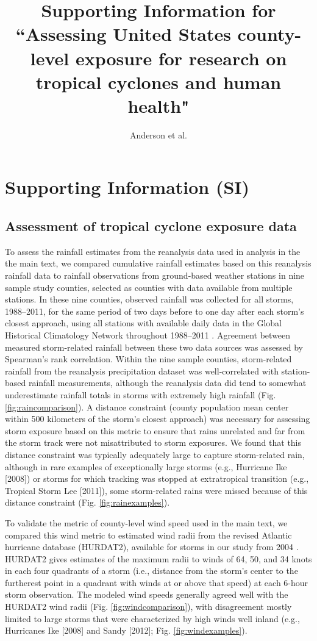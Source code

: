 \documentclass[fleqn,10pt,lineno]{olplainarticle}
\title{Supporting Information for ``Assessing United States county-level exposure for research on tropical cyclones and human health"}
\author{Anderson et al.}
\begin{document}
\flushbottom 
\maketitle 
\thispagestyle{empty}

\section*{Supporting Information (SI)}

\subsection*{Assessment of tropical cyclone exposure data}

To assess the rainfall estimates from the reanalysis data used in analysis in the the main text, we compared cumulative rainfall estimates based on this reanalysis rainfall data to rainfall observations from ground-based weather stations in nine sample study counties, selected as counties with data available from multiple stations. In these nine counties, observed rainfall was collected for all storms, 1988--2011, for the same period of two days before to one day after each storm's closest approach, using all stations with available daily data in the Global Historical Climatology Network throughout 1988--2011 \cite{menne2012overview, rnoaa, countyweather}. Agreement between measured storm-related rainfall between these two data sources was assessed by Spearman's rank correlation. Within the nine sample counties, storm-related rainfall from the reanalysis precipitation dataset was well-correlated with station-based rainfall measurements, although the reanalysis data did tend to somewhat underestimate rainfall totals in storms with extremely high rainfall (Fig. \ref{fig:raincomparison}). A distance constraint (county population mean center within 500 kilometers of the storm's closest approach) was necessary for assessing storm exposure based on this metric to ensure that rains unrelated and far from the storm track were not misattributed to storm exposures. We found that this distance constraint was typically adequately large to capture storm-related rain, although in rare examples of exceptionally large storms (e.g., Hurricane Ike [2008]) or storms for which tracking was stopped at extratropical transition (e.g., Tropical Storm Lee [2011]), some storm-related rains were missed because of this distance constraint (Fig. \ref{fig:rainexamples}).

To validate the metric of county-level wind speed used in the main text, we compared this wind metric to estimated wind radii from the revised Atlantic hurricane database (HURDAT2), available for storms in our study from 2004 \cite{landsea2013}. HURDAT2 gives estimates of the maximum radii to winds of 64, 50, and 34 knots in each four quadrants of a storm (i.e., distance from the storm's center to the furtherest point in a quadrant with winds at or above that speed) at each 6-hour storm observation. The modeled wind speeds generally agreed well with the HURDAT2 wind radii (Fig. \ref{fig:windcomparison}), with disagreement mostly limited to large storms that were characterized by high winds well inland (e.g., Hurricanes Ike [2008] and Sandy [2012]; Fig. \ref{fig:windexamples}).
\end{document}
